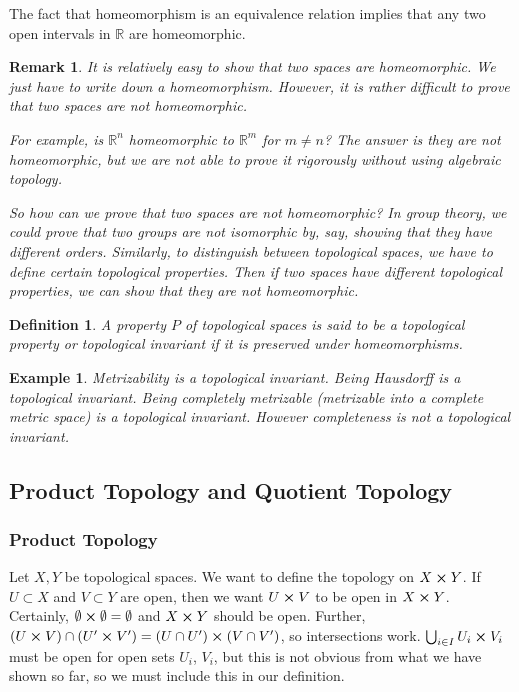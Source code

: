 \documentclass{article}
\theoremstyle{plain}\theoremheaderfont{\normalfont\itshape}\theorembodyfont{\rmfamily}\theoremseparator{.}\newtheorem*{rem}{Remark}\newtheorem*{ex}{Example}\newtheorem*{proof}{Proof}\newtheorem*{altp}{Alternative proof}
\theoremstyle{plain}\theoremheaderfont{\normalfont\bfseries}\theorembodyfont{\rmfamily}\theoremseparator{.}\newtheorem{thm}{Theorem}[section]\newtheorem{lem}[thm]{Lemma}\newtheorem{prop}[thm]{Proposition}\newtheorem*{cor}{Corollary}\newtheorem{defn}[thm]{Definition}\newtheorem{clm}[thm]{Claim}\newtheorem{clminproof}{Claim}
\theoremstyle{break}\theoremheaderfont{\normalfont\itshape}\theorembodyfont{\rmfamily}\theoremseparator{.\medskip}\newtheorem*{proofskip}{Proof}\newtheorem*{exs}{Examples}\newtheorem*{rems}{Remarks}
\theoremstyle{break}\theoremheaderfont{\normalfont\bfseries}\theorembodyfont{\rmfamily}\theoremseparator{.\medskip}\newtheorem{lemskip}[thm]{Lemma}\newtheorem{defnskip}[thm]{Definition}\newtheorem{propskip}[thm]{Proposition}\newtheorem{thmskip}[thm]{Theorem}
\begin{document}
    The fact that homeomorphism is an equivalence relation implies that any two open intervals in \(\mathbb{R}\) are homeomorphic.

    \begin{rem}
        It is relatively easy to show that two spaces are homeomorphic. We just have to write down a homeomorphism. However, it is rather difficult to prove that two spaces are not homeomorphic.

        For example, is \(\mathbb{R}^n\) homeomorphic to \(\mathbb{R}^m\) for \(m\ne n\)? The answer is they are not homeomorphic, but we are not able to prove it rigorously without using algebraic topology.

        So how can we prove that two spaces are not homeomorphic? In group theory, we could prove that two groups are not isomorphic by, say, showing that they have different orders. Similarly, to distinguish between topological spaces, we have to define certain topological properties. Then if two spaces have different
        topological properties, we can show that they are not homeomorphic.
    \end{rem}

    \begin{defn}
        A property \(P\) of topological spaces is said to be a \textit{topological property} or \textit{topological invariant} if it is preserved under homeomorphisms.
    \end{defn}
    \begin{ex}
        Metrizability is a topological invariant. Being Hausdorff is a topological invariant. Being completely metrizable (metrizable into a complete metric space) is a topological invariant. However completeness is not a topological invariant.
    \end{ex}

    \subsection{Product Topology and Quotient Topology}
    \subsubsection{Product Topology}
    Let \(X,Y\) be topological spaces. We want to define the topology on \(X\cross Y\). If \(U\subset X\) and \(V\subset Y\) are open, then we want \(U\cross V\) to be open in \(X\cross Y\). Certainly, \(\emptyset\cross\emptyset=\emptyset\) and \(X\cross Y\) should be open. Further, \((U\cross V)\cap(U'\cross V')=(U\cap U')\cross(V\cap V')\), so intersections work. \(\bigcup_{i\in I}U_i\cross V_i\) must be open for open sets \(U_i\), \(V_i\), but this is not obvious from what we have shown so far, so we must include this in our definition.
\end{document}
